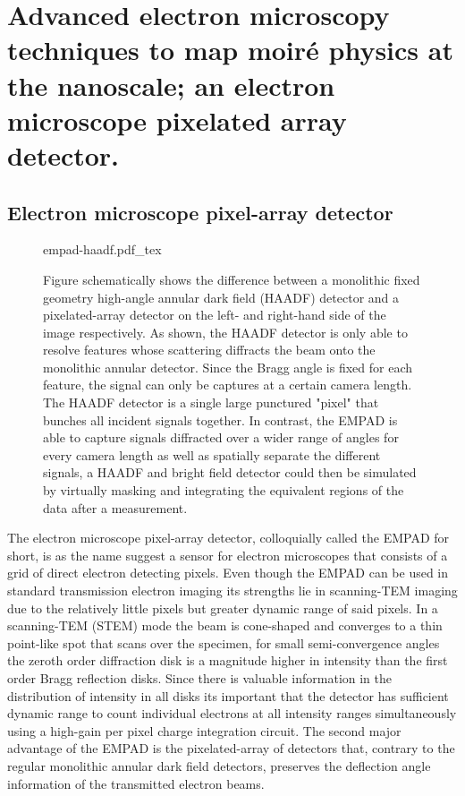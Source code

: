 \section{Advanced electron microscopy techniques to map moiré physics at the nanoscale; an electron microscope pixelated array detector.}

\subsection{Electron microscope pixel-array detector}

\begin{figure}[h]
	\centering
	\def\svgwidth{0.5\linewidth}
	{empad-haadf.pdf_tex}
	\caption{Figure schematically shows the difference between a monolithic fixed geometry high-angle annular dark field (HAADF) detector and a pixelated-array detector on the left- and right-hand side of the image respectively. As shown, the HAADF detector is only able to resolve features whose scattering diffracts the beam onto the monolithic annular detector. Since the Bragg angle is fixed for each feature, the signal can only be captures at a certain camera length. The HAADF detector is a single large punctured "pixel" that bunches all incident signals together. In contrast, the EMPAD is able to capture signals diffracted over a wider range of angles for every camera length as well as spatially separate the different signals, a HAADF and bright field detector could then be simulated by virtually masking and integrating the equivalent regions of the data after a measurement.}
	\label{fig:empad_haadf_comparison}
\end{figure}
The electron microscope pixel-array detector, colloquially called the EMPAD for short, is as the name suggest a sensor for electron microscopes that consists of a grid of direct electron detecting pixels. Even though the EMPAD can be used in standard transmission electron imaging its strengths lie in scanning-TEM imaging due to the relatively little pixels but greater dynamic range of said pixels.
In a scanning-TEM (STEM) mode the beam is cone-shaped and converges to a thin point-like spot that scans over the specimen, for small semi-convergence angles the zeroth order diffraction disk is a magnitude higher in intensity than the first order Bragg reflection disks. Since there is valuable information in the distribution of intensity in all disks its important that the detector has sufficient dynamic range to count individual electrons at all intensity ranges simultaneously using a high-gain per pixel charge integration circuit. The second major advantage of the EMPAD is the pixelated-array of detectors that, contrary to the regular monolithic annular dark field detectors, preserves the deflection angle information of the transmitted electron beams.
